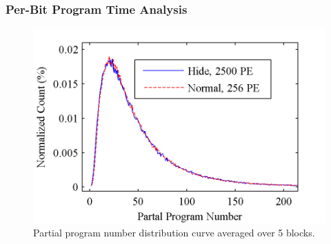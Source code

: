 

\subsubsection{Per-Bit Program Time Analysis}
\label{ssec:perbit-analysis}





\begin{figure} 
\begin{center} 
\includegraphics[width=\mywidth]{figs/histo_compare.png} 
\caption{Partial program number distribution curve averaged over 5 blocks.}
\label{fig:histo_comp} 
\vspace{-0.1in}

\end{center} 
\end{figure}

